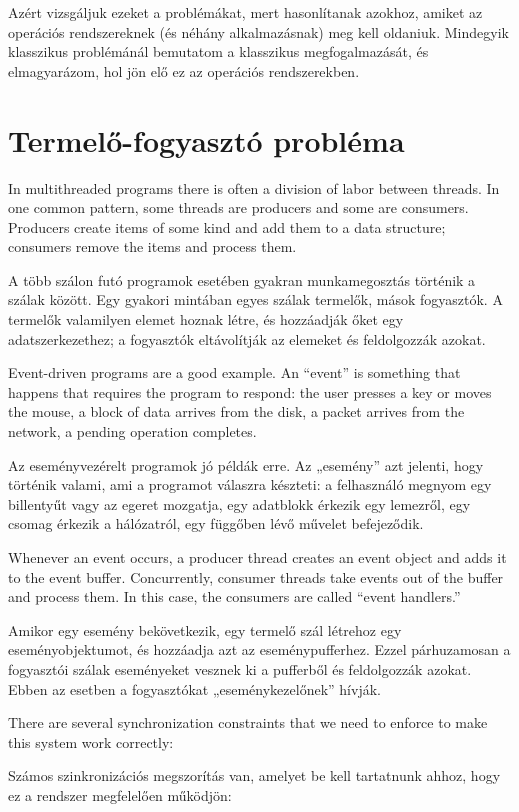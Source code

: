 \documentclass{book}
\begin{document}
Azért vizsgáljuk ezeket a problémákat, mert hasonlítanak
azokhoz, amiket az operációs rendszereknek (és néhány alkalmazásnak)
meg kell oldaniuk. Mindegyik klasszikus problémánál bemutatom a klasszikus
megfogalmazását, és elmagyarázom, hol jön elő ez az operációs
rendszerekben.

\section{Termelő-fogyasztó probléma}

In multithreaded programs there is often a division of labor between
threads.  In one common pattern, some threads are producers and some
are consumers.  Producers create items of some kind and add them to a
data structure; consumers remove the items and process them.

A több szálon futó programok esetében gyakran munkamegosztás
történik a szálak között. Egy gyakori mintában egyes szálak
termelők, mások fogyasztók. A termelők valamilyen elemet
hoznak létre, és hozzáadják őket egy adatszerkezethez;
a fogyasztók eltávolítják az elemeket és feldolgozzák azokat.

Event-driven programs are a good example.  An ``event'' is something
that happens that requires the program to respond: the user presses a
key or moves the mouse, a block of data arrives from the disk, a
packet arrives from the network, a pending operation completes.

Az eseményvezérelt programok jó példák erre. Az „esemény”
azt jelenti, hogy történik valami, ami a programot válaszra készteti:
a felhasználó megnyom egy billentyűt vagy az egeret mozgatja,
egy adatblokk érkezik egy lemezről, egy csomag érkezik a
hálózatról, egy függőben lévő művelet befejeződik.

Whenever an event occurs, a producer thread creates an event
object and adds it to the event buffer.  Concurrently, consumer
threads take events out of the buffer and process them.
In this case, the consumers are called ``event handlers.''

Amikor egy esemény bekövetkezik, egy termelő szál létrehoz egy
eseményobjektumot, és hozzáadja azt az eseménypufferhez.
Ezzel párhuzamosan a fogyasztói szálak eseményeket vesznek ki
a pufferből és feldolgozzák azokat. Ebben az esetben a fogyasztókat
„eseménykezelőnek” hívják.

There are several synchronization constraints that we need to
enforce to make this system work correctly:

Számos szinkronizációs megszorítás van, amelyet be kell
tartatnunk ahhoz, hogy ez a rendszer megfelelően működjön:
\end{document}

